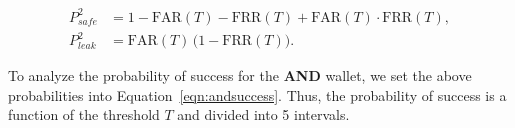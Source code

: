 \documentclass[sigconf]{acmart}
\theoremstyle{definition}
\begin{document}
\[
\begin{aligned}
P^2_{safe} &= 1 - \text{FAR}(T) - \text{FRR}(T) + \text{FAR}(T) \cdot \text{FRR}(T),\\
P^2_{leak} &= \text{FAR}(T)\,\bigl(1 - \text{FRR}(T)\bigr).
\end{aligned}
\]

To analyze the probability of success for the \textbf{AND} wallet, we set the above probabilities into Equation~\ref{eqn:andsuccess}. Thus, the probability of success is a function of the threshold $T$ and divided into 5 intervals.

\newcommand{\Psuccess}{\ensuremath{
P_{\text{success}}(T)=
\begin{cases}
P^{1}_{\text{safe}}, 
& T \le a_1, \\[10pt]

(P^{1}_{\text{safe}} + P^{1}_{\text{leak}})
- P^{1}_{\text{leak}}\,\dfrac{a_2 - T}{a_2 - a_1}, 
& a_1 < T \le u_1, \\[14pt]

\dfrac{u_2 - T}{u_2 - u_1}
\left[
(P^{1}_{\text{safe}} + P^{1}_{\text{leak}})
- P^{1}_{\text{leak}}\,\dfrac{a_2 - T}{a_2 - a_1}
\right],
& u_1 < T \le a_2, \\[16pt]

\dfrac{u_2 - T}{u_2 - u_1}
(P^{1}_{\text{safe}} + P^{1}_{\text{leak}}),
& a_2 < T \le u_2, \\[12pt]

0, 
& T > u_2
\end{cases}
}\xspace}

\newcommand{\contprobabilities}{
\begin{align*}
P^{2}_{\text{safe}}(T) &= 1 - \mathrm{FAR}(T) - \mathrm{FRR}(T) + \mathrm{FAR}(T)\mathrm{FRR}(T),\\
P^{2}_{\text{loss}}(T) &= \mathrm{FRR}(T)\bigl(1 - \mathrm{FAR}(T)\bigr),\\
P^{2}_{\text{leak}}(T) &= \mathrm{FAR}(T)\bigl(1 - \mathrm{FRR}(T)\bigr),\\
P^{2}_{\text{theft}}(T) &= \mathrm{FAR}(T)\mathrm{FRR}(T).
\end{align*}
}
\newcommand{\ANDintegration}{\ensuremath{
P^{\text{AND}}_{\text{success}}(T)
=
\bigl(1-\mathrm{FRR}(T)\bigr)
\Bigl(
P^{1}_{\text{safe}}
+
P^{1}_{\text{leak}}\bigl(1-\mathrm{FAR}(T)\bigr)
\Bigr).
}\xspace}
\newcommand{\ORintegration}{\ensuremath{
    P^{\text{OR}}_{\text{success}}(T)
=
\bigl(1-\mathrm{FAR}(T)\bigr)
\Bigl(
P^{1}_{\text{safe}}
+
P^{1}_{\text{loss}}\bigl(1-\mathrm{FRR}(T)\bigr)
\Bigr).
}\xspace}
\end{document}
